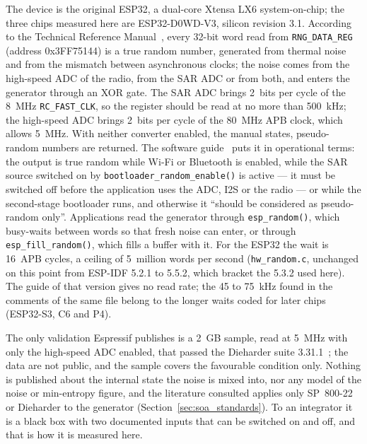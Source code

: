 The device is the original ESP32, a dual-core Xtensa LX6 system-on-chip;
the three chips measured here are ESP32-D0WD-V3, silicon revision 3.1.
According to the Technical Reference
Manual~\cite{espressif_trm_esp32}, every 32-bit word read from
\texttt{RNG\_DATA\_REG} (address 0x3FF75144) is a true random number,
generated from thermal noise and from the mismatch between asynchronous
clocks; the noise comes from the high-speed ADC of the radio, from the SAR
ADC or from both, and enters the generator through an XOR gate. The SAR
ADC brings 2~bits per cycle of the 8~MHz \texttt{RC\_FAST\_CLK}, so the
register should be read at no more than 500~kHz; the high-speed ADC
brings 2~bits per cycle of the 80~MHz APB clock, which allows 5~MHz. With
neither converter enabled, the manual states, pseudo-random numbers are
returned. The software guide~\cite{espressif_idf_random} puts it in
operational terms: the output is true random while Wi-Fi or Bluetooth is
enabled, while the SAR source switched on by
\texttt{bootloader\_random\_enable()} is active --- it must be switched
off before the application uses the ADC, I2S or the radio --- or while
the second-stage bootloader runs, and otherwise it ``should be considered
as pseudo-random only''. Applications read the generator through
\texttt{esp\_random()}, which busy-waits between words so that fresh
noise can enter, or through \texttt{esp\_fill\_random()}, which fills a
buffer with it. For the ESP32 the wait is 16~APB cycles, a ceiling of
5~million words per second (\texttt{hw\_random.c}, unchanged on this
point from ESP-IDF 5.2.1 to 5.5.2, which bracket the 5.3.2 used here). The
guide of that version gives no read rate; the 45 to 75~kHz found in the
comments of the same file belong to the longer waits coded for later
chips (ESP32-S3, C6 and P4).

The only validation Espressif publishes is a 2~GB sample, read at 5~MHz
with only the high-speed ADC enabled, that passed the Dieharder suite
3.31.1~\cite{espressif_trm_esp32}; the data are not public, and the
sample covers the favourable condition only. Nothing is published about
the internal state the noise is mixed into, nor any model of the noise or
min-entropy figure, and the literature consulted applies only SP~800-22 or
Dieharder to the generator (Section~\ref{sec:soa_standards}). To an
integrator it is a black box with two documented inputs that can be
switched on and off, and that is how it is measured here.

